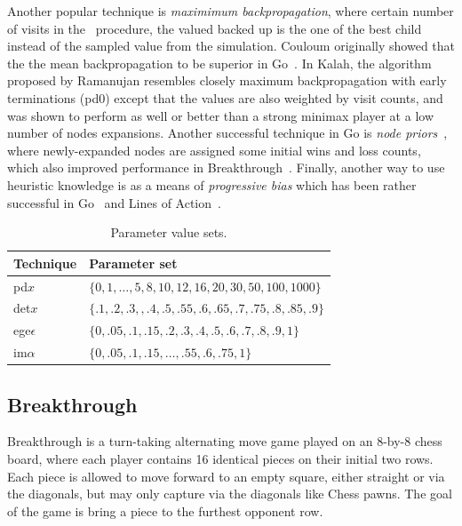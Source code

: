 \documentclass[letterpaper]{article}
\begin{document}
Another popular technique is {\it maximimum backpropagation}, where certain number of visits in the \Update~procedure,
the valued backed up is the one of the best child instead of the sampled value from the simulation.
Couloum originally showed that the the mean backpropagation to be superior in Go~\cite{Coulom06Efficient}. 
In Kalah, the \UCTMAXH algorithm proposed by Ramanujan resembles closely maximum backpropagation with early terminations 
(pd0) except that the values are also weighted by visit counts, and was shown to perform as well or better than a strong minimax 
player at a low number of nodes expansions. Another successful technique in Go is 
{\it node priors}~\cite{Gelly07Combining}, where newly-expanded nodes are assigned some initial wins and loss counts, 
which also improved performance in Breakthrough~\cite{Lorentz13Breakthrough}. Finally, another way to use 
heuristic knowledge is as a means of {\it progressive bias} which has been rather successful
in Go~\cite{Gelly07Combining,ChaslotWHUB2008} and Lines of Action~\cite{Winands10MCTS-LOA}.

\begin{table}[t]
{\small
\begin{center}
\begin{tabular}{|l|l|}
\hline
Technique & Parameter set \\
\hline
pd$x$          & $\{ 0, 1, \ldots, 5, 8, 10, 12, 16, 20, 30, 50, 100, 1000 \}$ \\
det$x$         & $\{ .1, .2, .3, , .4, .5, .55, .6, .65, .7, .75, .8, .85, .9 \}$ \\
ege$\epsilon$  & $\{ 0, .05, .1, .15, .2, .3, .4, .5, .6, .7, .8, .9, 1 \}$ \\
im$\alpha$     & $\{ 0, .05, .1, .15, \ldots, .55, .6, .75, 1 \}$ \\
\hline
\end{tabular}
\end{center}
\caption{Parameter value sets.}
\label{tbl:parmsets}
}
\end{table}

\subsection{Breakthrough}

Breakthrough is a turn-taking alternating move game played on an 8-by-8 chess board, where each player 
contains 16 identical pieces on their initial two rows. 
Each piece is allowed to move forward to an empty square, either straight or via the diagonals, but may only 
capture via the diagonals like Chess pawns. The goal of the game is bring a piece to the furthest opponent row. 
\end{document}
